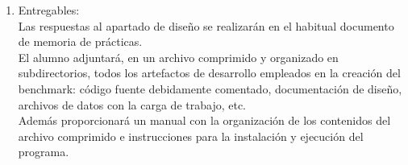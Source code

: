 \documentclass[a4paper,10pt]{article}
\newenvironment{answer}{%
\begin{list}{}{%
}%
\item[]}{\end{list}}
\begin{document}
{\begin{enumerate}[label=\alph*.]
  \begin{itemize}
   \item Integrando la lógica de análisis en el propio programa, mediante
    el uso de una librería estadística. Esta será la opción más valorada.
   \item Importando los resultados a una herramienta estadística de su elección
    y realizando el permitente análisis off-line.
  \end{itemize}
  En ambos casos, el alumno deberá explicar los resultados obtenidos.\\
  El benchmark debe funcionar de forma autónoma, reduciendo al máximo
  la necesidad de intervención del usuario. Por ejemplo, limitándola al
  cambio de dispositivo hardware. En todo caso, el programa debe interactuar
  con el usuario de forma sencilla y clara.\\
  \item Entregables:\\
  Las respuestas al apartado de diseño se realizarán en el habitual
  documento de memoria de prácticas.\\
  El alumno adjuntará, en un archivo comprimido y organizado en
  subdirectorios, todos los artefactos de desarrollo empleados en la
  creación del benchmark: código fuente debidamente comentado,
  documentación de diseño, archivos de datos con la carga de trabajo, etc.\\
  Además proporcionará un manual con la organización de los contenidos
  del archivo comprimido e instrucciones para la instalación y ejecución
  del programa.
 \end{enumerate}
}


 
 \begin{answer}
 
\end{answer}

\newpage
\printbibliography
\end{document}
